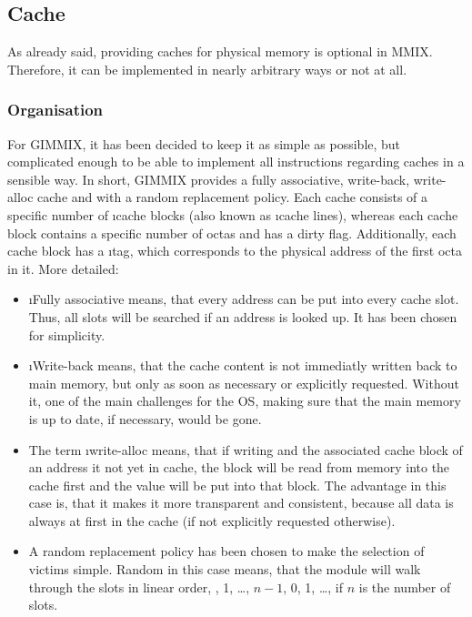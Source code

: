 \subsection{Cache}

As already said, providing caches for physical memory is optional in MMIX. Therefore, it can be implemented in nearly arbitrary ways or not at all.

\subsubsection{Organisation}

For GIMMIX, it has been decided to keep it as simple as possible, but complicated enough to be able to implement all instructions regarding caches in a sensible way. In short, GIMMIX provides a fully associative, write-back, write-alloc cache and with a random replacement policy. Each cache consists of a specific number of \i{cache blocks} (also known as \i{cache lines}), whereas each cache block contains a specific number of octas and has a dirty flag. Additionally, each cache block has a \i{tag}, which corresponds to the physical address of the first octa in it. More detailed:
\begin{itemize}
	\item \i{Fully associative} means, that every address can be put into every cache slot. Thus, all slots will be searched if an address is looked up. It has been chosen for simplicity.
	\item \i{Write-back} means, that the cache content is not immediatly written back to main memory, but only as soon as necessary or explicitly requested. Without it, one of the main challenges for the OS, \ie making sure that the main memory is up to date, if necessary, would be gone.
	\item The term \i{write-alloc} means, that if writing and the associated cache block of an address it not yet in cache, the block will be read from memory into the cache first and the value will be put into that block. The advantage in this case is, that it makes it more transparent and consistent, because all data is always at first in the cache (if not explicitly requested otherwise).
	\item A random replacement policy has been chosen to make the selection of victims simple. Random in this case means, that the module will walk through the slots in linear order, , 1, \dots, $n-1$, 0, 1, \dots, if $n$ is the number of slots.
\end{itemize}

